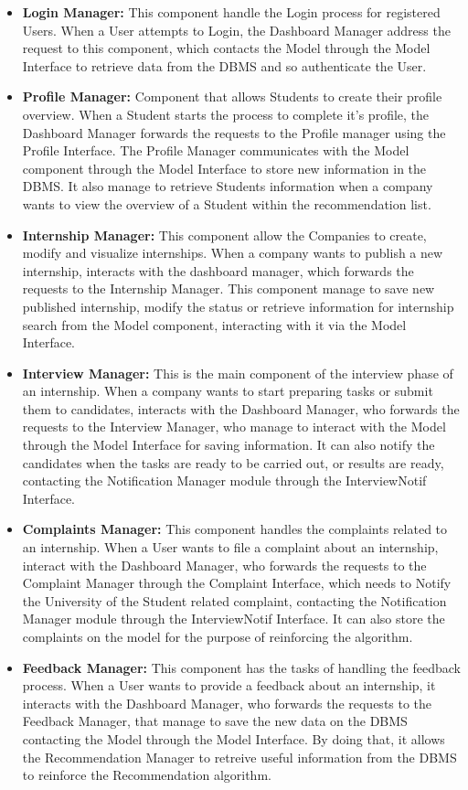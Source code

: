 \begin{itemize}
    \item \textbf{Login Manager:} This component handle the Login process for registered Users. When a User attempts to Login, the Dashboard Manager address the request to this component, which contacts the Model through the Model Interface to retrieve data from the DBMS and so authenticate the User. 
    \item \textbf{Profile Manager:} Component that allows Students to create their profile overview. When a Student starts the process to complete it's profile, the Dashboard Manager forwards the requests to the Profile manager using the Profile Interface. The Profile Manager communicates with the Model component through the Model Interface to store new information in the DBMS. It also manage to retrieve Students information when a company wants to view the overview of a Student within the recommendation list.
    \item \textbf{Internship Manager:} This component allow the Companies to create, modify and visualize internships. When a company wants to publish a new internship, interacts with the dashboard manager, which forwards the requests to the Internship Manager. This component manage to save new published internship, modify the status or retrieve information for internship search from the Model component, interacting with it via the Model Interface.
    \item \textbf{Interview Manager:} This is the main component of the interview phase of an internship. When a company wants to start preparing tasks or submit them to candidates, interacts with the Dashboard Manager, who forwards the requests to the Interview Manager, who manage to interact with the Model through the Model Interface for saving information. It can also notify the candidates when the tasks are ready to be carried out, or results are ready, contacting the Notification Manager module through the InterviewNotif Interface.
    \item \textbf{Complaints Manager:} This component handles the complaints related to an internship. When a User wants to file a complaint about an internship, interact with the Dashboard Manager, who forwards the requests to the Complaint Manager through the Complaint Interface, which needs to Notify the University of the Student related complaint, contacting the Notification Manager module through the InterviewNotif Interface. It can also store the complaints on the model for the purpose of reinforcing the algorithm.
    \item \textbf{Feedback Manager:} This component has the tasks of handling the feedback process. When a User wants to provide a feedback about an internship, it interacts with the Dashboard Manager, who forwards the requests to the Feedback Manager, that manage to save the new data on the DBMS contacting the Model through the Model Interface. By doing that, it allows the Recommendation Manager to retreive useful information from the DBMS to reinforce the Recommendation algorithm.

\end{itemize}
